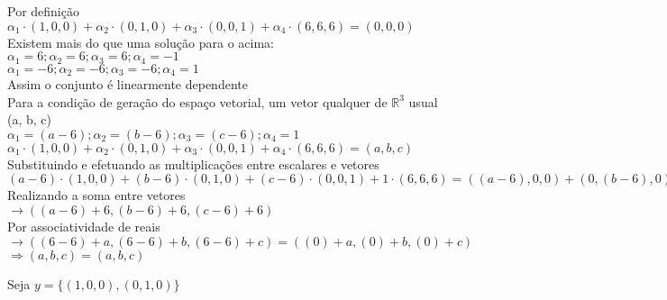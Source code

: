 \documentclass[12pt, twoside, a4]{article} %
\begin{document}
\begin{center}
    \begin{doublespacing}
        Por definição
        \\
        $ \alpha_1 \cdot (1,0,0) +  \alpha_2 \cdot (0,1,0) +\alpha_3 \cdot (0,0,1) + \alpha_4  \cdot (6,6,6) = (0,0,0)$
        \\
        Existem mais do que uma solução para o acima:
        \\
        $ \alpha_1=6 ; \alpha_2 = 6 ;\alpha_3 =6 ; \alpha_4 = -1$
        \\
        $ \alpha_1=-6 ; \alpha_2 = -6 ;\alpha_3 =-6 ; \alpha_4 = 1$
        \\
        Assim o conjunto é linearmente dependente
        \\
        Para a condição de geração do espaço vetorial, um vetor qualquer de $\mathbb{R}^3$ usual
        \\
        (a, b, c)
        \\
        $ \alpha_1=(a - 6) ; \alpha_2 = (b - 6) ;\alpha_3 =(c - 6) ; \alpha_4 = 1$
        \\ 
        $ \alpha_1 \cdot (1,0,0) +  \alpha_2 \cdot (0,1,0) +\alpha_3 \cdot (0,0,1) + \alpha_4  \cdot (6,6,6) = (a,b,c)$
        \\
        Substituindo e efetuando as multiplicações entre escalares e vetores
        \\
        $ (a - 6) \cdot (1,0,0) +  (b - 6) \cdot (0,1,0) + (c - 6) \cdot (0,0,1) + 1\cdot (6,6,6) =  ((a - 6),0,0) +   (0,(b - 6),0) +  (0,0,(c - 6)) + (6,6,6)$
        \\
        Realizando a soma entre vetores
        \\
        $\to  ((a - 6) + 6,(b - 6) + 6,(c - 6) + 6)$
        \\
        Por associatividade de reais
        \\
        $\to  ((6 - 6) + a,(6 - 6) + b,(6 - 6) + c) =  ((0) + a,(0) + b,(0) + c)$
        \\
        $\Rightarrow (a, b, c) = (a, b, c) $

    \end{doublespacing}
\end{center}
\noindent
Seja $y = \{ (1,0,0), (0,1,0) \} $
\vspace{-0.3cm}
\end{document}

